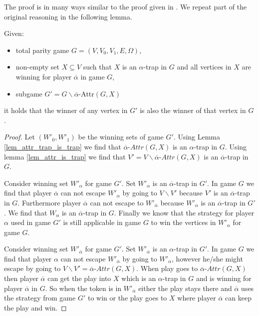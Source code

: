 The proof is in many ways similar to the proof given in \cite{ZIELONKA1998135}. We repeat part of the original reasoning in the following lemma.
\begin{lemma}
\label{lem_GwithoutB_is_subset}
	Given:
	\begin{itemize}
		\item total parity game $G = (V,V_0,V_1,E,\Omega)$,
		\item non-empty set $X \subseteq V$ such that $X$ is an $\alpha$-trap in $G$ and all vertices in $X$ are winning for player $\overline{\alpha}$ in game $G$,
		\item subgame $G' = G\backslash \overline{\alpha}$-Attr$(G,X)$
	\end{itemize}
	it holds that the winner of any vertex in $G'$ is also the winner of that vertex in $G$.
	\begin{proof}
		Let $(W'_0, W'_1)$ be the winning sets of game $G'$. Using Lemma \ref{lem_attr_trap_is_trap} we find that $\overline{\alpha}\textit{-Attr}(G,X)$ is an $\alpha$-trap in $G$. Using lemma \ref{lem_attr_is_trap} we find that $V' = V\backslash \overline{\alpha}\textit{-Attr}(G,X)$ is an $\overline{\alpha}$-trap in $G$.
		
		Consider winning set $W'_\alpha$ for game $G'$. Set $W'_\alpha$ is an $\overline{\alpha}$-trap in $G'$. In game $G$ we find that player $\overline{\alpha}$ can not escape $W'_\alpha$ by going to $V\backslash  V'$ because $V'$ is an $\overline{\alpha}$-trap in $G$. Furthermore player $\overline{\alpha}$ can not escape to $W'_{\overline{\alpha}}$ because $W'_\alpha$ is an $\overline{\alpha}$-trap in $G'$. We find that $W_\alpha$ is an $\overline{\alpha}$-trap in $G$. Finally we know that the strategy for player $\alpha$ used in game $G'$ is still applicable in game $G$ to win the vertices in $W'_\alpha$ for game $G$.
		
		Consider winning set $W'_{\overline{\alpha}}$ for game $G'$. Set $W'_{\overline{\alpha}}$ is an $\alpha$-trap in $G'$. In game $G$ we find that player $\alpha$ can not escape $W'_{\overline{\alpha}}$ by going to $W'_\alpha$, however he/she might escape by going to $V\backslash V' = \overline{\alpha}\textit{-Attr}(G,X)$. When play goes to $\overline{\alpha}\textit{-Attr}(G,X)$ then player $\overline{\alpha}$ can get the play into $X$ which is an $\alpha$-trap in $G$ and is winning for player $\overline{\alpha}$ in $G$. So when the token is in $W'_{\overline{\alpha}}$ either the play stays there and $\overline{\alpha}$ uses the strategy from game $G'$ to win or the play goes to $X$ where player $\overline{\alpha}$ can keep the play and win.
	\end{proof}
\end{lemma}

